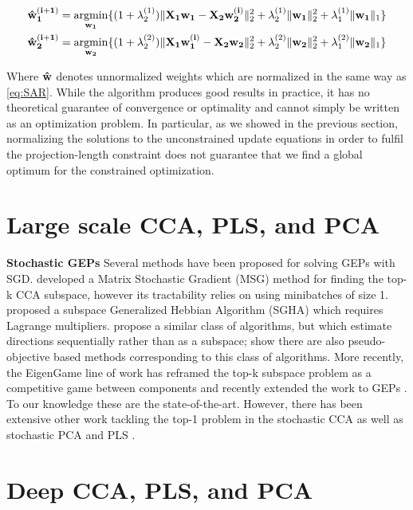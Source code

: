 \begin{align}
    & \bold{\hat{w}^{(i+1)}_1}=\underset{\bold{w_1}}{\mathrm{argmin}}\{(1+\lambda^{(1)}_2)\|\bold{X_1w_1-X_2w^{(i)}_2}\|^2_2 + \lambda^{(1)}_2\|\bold{w_1}\|^2_2 + \lambda^{(1)}_1\|\bold{w_1}\|_1 \}\\
    & \bold{\hat{w}^{(i+1)}_2}=\underset{\bold{w_2}}{\mathrm{argmin}}\{(1+\lambda^{(2)}_2)\|\bold{X_1w_1^{(i)}-X_2w_2}\|^2_2 + \lambda^{(2)}_2\|\bold{w_2}\|^2_2 + \lambda^{(2)}_1\|\bold{w_2}\|_1 \}
\end{align}

Where $\bold{\hat{w}}$ denotes unnormalized weights which are normalized in the same way as \ref{eq:SAR}. While the algorithm produces good results in practice, it has no theoretical guarantee of convergence or optimality and cannot simply be written as an optimization problem. In particular, as we showed in the previous section, normalizing the solutions to the unconstrained update equations in order to fulfil the projection-length constraint does not guarantee that we find a global optimum for the constrained optimization. 


\section{Large scale CCA, PLS, and PCA}

\textbf{Stochastic GEPs}
Several methods have been proposed for solving GEPs with SGD.
\cite{arora2017stochastic} developed a Matrix Stochastic Gradient (MSG) method for finding the top-k CCA subspace, however its tractability relies on using minibatches of size 1. \cite{chen2019constrained} proposed a subspace Generalized Hebbian Algorithm (SGHA) which requires Lagrange multipliers. \cite{xie2015scale} propose a similar class of algorithms, but which estimate directions sequentially rather than as a subspace; \cite{chapman2022generalized} show there are also pseudo-objective based methods corresponding to this class of algorithms. More recently, the EigenGame line of work \cite{gemp20,gemp2021} has reframed the top-k subspace problem as a competitive game between components and recently extended the work to GEPs \cite{gemp2022generalized}. To our knowledge these are the state-of-the-art. However, there has been extensive other work tackling the top-1 problem in the stochastic CCA as well as stochastic PCA and PLS \cite{arora2012stochastic,arora2016stochastic,arora2017stochastic}.

\section{Deep CCA, PLS, and PCA}

